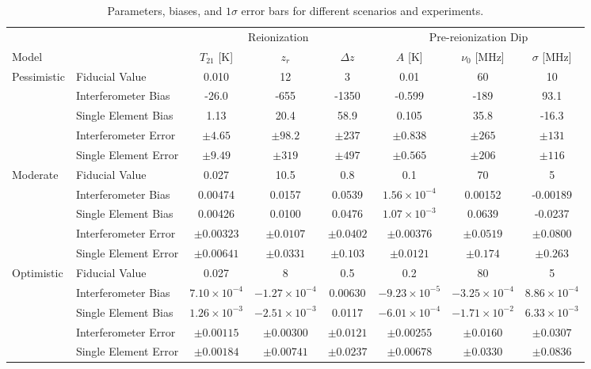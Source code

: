 \documentclass[twocolumn,apj,numberedappendix]{emulateapj}
\begin{document}
\begin{table}[htbp]
   \centering
   \begin{tabular}{@{} llcccccc @{}} %
      \toprule
      & & \multicolumn{3}{c}{Reionization} & \multicolumn{3}{c}{Pre-reionization Dip} \\
      \cmidrule(lr){3-5} %
      \cmidrule(lr){6-8} 
      Model &  & $T_{21}$ [K] & $z_r$ & $\Delta z$ & $A$ [K] & $\nu_0$ [MHz] & $\sigma$ [MHz]\\
      \midrule
      Pessimistic & Fiducial Value & 0.010 & 12 & 3 & 0.01 & 60 & 10 \\
      \cmidrule(l){2-8} 
      			 & Interferometer Bias & -26.0 & -655 & -1350 & -0.599 & -189 & 93.1 \\
			 & Single Element Bias & 1.13 & 20.4 & 58.9 & 0.105 & 35.8 & -16.3 \\	 
      			 & Interferometer Error & $\pm 4.65$ & $\pm 98.2$ & $\pm 237$ & $\pm 0.838$ & $\pm 265$ & $\pm 131$ \\
      			 & Single Element Error  & $\pm 9.49 $ & $\pm 319$ & $\pm 497$ & $\pm 0.565$ & $\pm 206$ & $\pm 116$ \\
      \midrule
      Moderate & Fiducial Value & 0.027 & 10.5 & 0.8 & 0.1 & 70 & 5 \\
      \cmidrule(l){2-8}
			 & Interferometer Bias & 0.00474 & 0.0157 & 0.0539 & $1.56\times10^{-4}$ & 0.00152 & -0.00189 \\
			 & Single Element Bias & 0.00426 & 0.0100 & 0.0476 & $1.07\times10^{-3}$ & 0.0639 & -0.0237 \\	
      			 & Interferometer Error & $\pm 0.00323$ & $\pm 0.0107$ & $\pm 0.0402$ & $\pm 0.00376$ & $\pm 0.0519$ & $\pm 0.0800$ \\
      			 & Single Element Error  & $\pm 0.00641$ & $\pm 0.0331$ & $\pm 0.103$ & $\pm 0.0121$ & $\pm 0.174$ & $\pm 0.263$ \\
      \midrule
      Optimistic & Fiducial Value & 0.027 & 8 & 0.5 & 0.2 & 80 & 5 \\
      \cmidrule(l){2-8}
			 & Interferometer Bias & $7.10\times10^{-4}$ & $-1.27\times10^{-4}$ & 0.00630 & $-9.23\times 10^{-5}$ &$ -3.25\times 10^{-4}$ & $8.86\times 10^{-4}$ \\
			 & Single Element Bias & $1.26\times10^{-3}$ & $-2.51\times10^{-3}$ & 0.0117 & $-6.01\times10^{-4}$ & $-1.71\times10^{-2}$ & $6.33\times10^{-3}$ \\
      			 & Interferometer Error & $\pm 0.00115$ & $\pm 0.00300$ & $\pm 0.0121$ & $\pm 0.00255$ & $\pm 0.0160$ & $\pm 0.0307$ \\
      			 & Single Element Error  & $\pm 0.00184$ & $\pm 0.00741$ & $\pm 0.0237$ & $\pm 0.00678$ & $\pm 0.0330$ & $\pm 0.0836$ \\
      \bottomrule
   \end{tabular}
   \caption{Parameters, biases, and $1\sigma$ error bars for different scenarios and experiments.}
   \label{tab:params}
\end{table}
\end{document}
